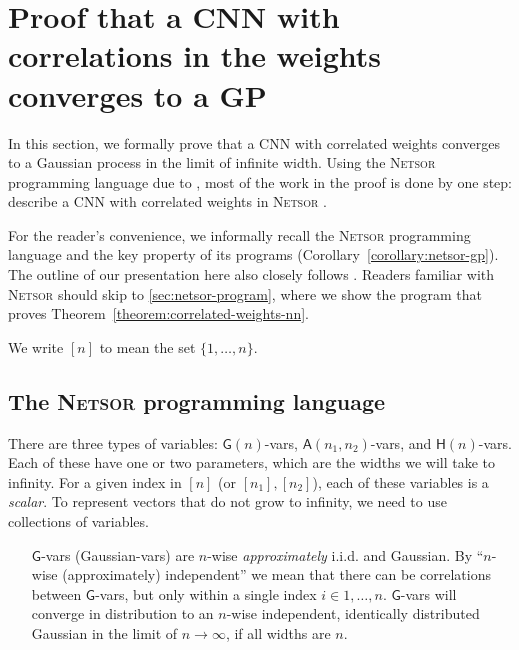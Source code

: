 \appendix
\section{Proof that a CNN with correlations in the weights converges to a GP\label{app:netsor}}
{  %
  \newcommand{\Gva}{\mathsf{G}}
  \newcommand{\Hva}{\mathsf{H}}
  \newcommand{\Ava}{\mathsf{A}}
  \newcommand{\MatMul}{{\texttt{MatMul} }}
  \newcommand{\LinComb}{{\texttt{LinComb} }}
  \newcommand{\Nonlin}{{\texttt{Nonlin} }}
  \newcommand{\Netsor}{{\textsc{Netsor} }}


In this section, we formally prove that a CNN with correlated weights converges
to a Gaussian process in the limit of infinite width. Using the \Netsor
programming language due to \citet{yang2019wide}, most of the work in the proof
is done by
one step: describe a CNN with correlated weights in \Netsor.

For the reader's convenience, we informally recall the \Netsor programming language
\citep{yang2019wide} and the key property of its programs (Corollary~\ref{corollary:netsor-gp}). The outline of our presentation here also closely follows
\citet{yang2019wide}. Readers familiar with \Netsor should skip to
\cref{sec:netsor-program}, where we show the program that proves Theorem~\ref{theorem:correlated-weights-nn}.


We write $[n]$ to mean the set $\{1,\dots,n\}$.

\subsection{The \Netsor programming language}
There are three types of variables: $\Gva(n)$-vars, $\Ava(n_1,
n_2)$-vars, and $\Hva(n)$-vars. Each of these have one or two
parameters, which are the widths we will take to infinity. For a
given index in $[n]$ (or $[n_1],[n_2]$), each of these variables is a \emph{scalar}. To
represent vectors that do not grow to infinity, we need to use collections of variables.

\begin{itemize}
\item[$\Gva$-vars] (Gaussian-vars) are $n$-wise \emph{approximately}
i.i.d. and Gaussian. By ``$n$-wise (approximately) independent'' we mean that there can be
correlations between $\Gva$-vars, but only within a single index $i \in 1,\dots,n$.
$\Gva$-vars will converge in
distribution to an $n$-wise independent, identically distributed Gaussian in the limit of $n \to \infty$, if
all widths are $n$.


\end{itemize}}
